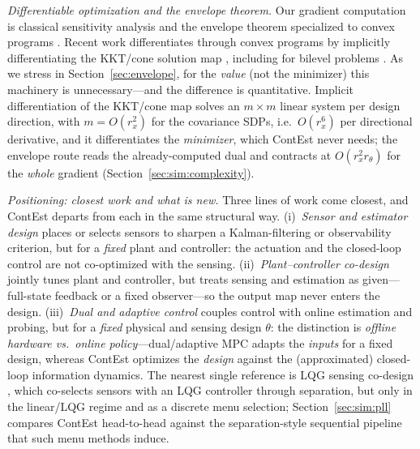 \documentclass[twocolumn,amsthm]{autart}
\begin{document}
\emph{Differentiable optimization and the envelope theorem.}
Our gradient computation is classical sensitivity analysis
\cite{bonnans2000perturbation} and the envelope theorem \cite{milgrom2002envelope}
specialized to convex programs \cite{boyd2004convex}. Recent work differentiates
through convex programs by implicitly differentiating the KKT/cone solution map
\cite{amos2017optnet,agrawal2019differentiable}, including for bilevel problems
\cite{gould2016differentiating}. As we stress in
Section~\ref{sec:envelope}, for the \emph{value} (not the minimizer) this
machinery is unnecessary---and the difference is quantitative. Implicit
differentiation of the KKT/cone map solves an $m\times m$ linear system per design
direction, with $m=O(r_x^2)$ for the covariance SDPs, i.e.\ $O(r_x^6)$ per
directional derivative, and it differentiates the \emph{minimizer}, which ContEst
never needs; the envelope route reads the already-computed dual and contracts at
$O(r_x^2 r_\theta)$ for the \emph{whole} gradient (Section~\ref{sec:sim:complexity}).

\emph{Positioning: closest work and what is new.}
Three lines of work come closest, and ContEst departs from each in the same
structural way. (i)~\emph{Sensor and estimator design}
\cite{joshi2009sensor,tzoumas2016sensor,zhang2017sensor} places or
selects sensors to sharpen a Kalman-filtering or observability criterion, but for
a \emph{fixed} plant and controller: the actuation and the closed-loop control
are not co-optimized with the sensing. (ii)~\emph{Plant--controller co-design}
\cite{fathy2001coupling,herber2019nested,grigoriadis1998integrate} jointly tunes
plant and controller, but treats sensing and estimation as given---full-state
feedback or a fixed observer---so the output map never enters the design.
(iii)~\emph{Dual and adaptive control}
\cite{feldbaum1960dual,bar1974dual,mesbah2018stochastic} couples
control with online estimation and probing, but for a \emph{fixed} physical and
sensing design $\theta$: the distinction is \emph{offline hardware vs.\ online
policy}---dual/adaptive MPC adapts the \emph{inputs} for a fixed design, whereas
ContEst optimizes the \emph{design} against the (approximated) closed-loop
information dynamics. The nearest single reference is LQG sensing co-design
\cite{tzoumas2021lqg}, which co-selects sensors with an LQG controller through
separation, but only in the linear/LQG regime and as a discrete menu selection;
Section~\ref{sec:sim:pll} compares ContEst head-to-head against the
separation-style sequential pipeline that such menu methods induce.
\end{document}
